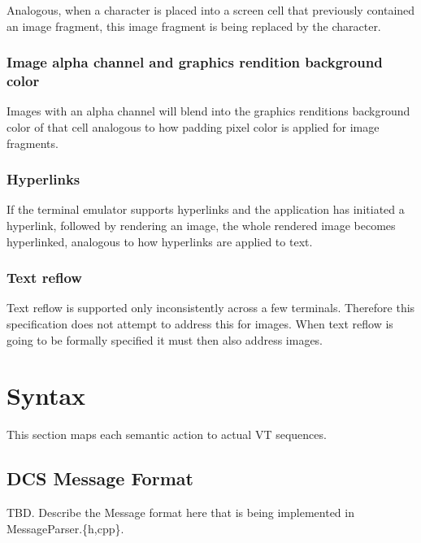 \documentclass[a4paper]{article}
\begin{document}
Analogous, when a character is placed into a screen cell that previously contained an image
fragment, this image fragment is being replaced by the character.

\subsubsection*{Image alpha channel and graphics rendition background color}

Images with an alpha channel will blend into the graphics renditions background color of that cell
analogous to how padding pixel color is applied for image fragments.

\subsubsection*{Hyperlinks}

If the terminal emulator supports hyperlinks and the application has initiated a hyperlink, followed
by rendering an image, the whole rendered image becomes hyperlinked, analogous to how hyperlinks
are applied to text.

\subsubsection*{Text reflow}

Text reflow is supported only inconsistently across a few terminals. Therefore this
specification does not attempt to address this for images. When text reflow is going to
be formally specified it must then also address images.

\section{Syntax} %

This section maps each semantic action to actual VT sequences.

\subsection{DCS Message Format}


TBD. Describe the Message format here that is being implemented in MessageParser.\{h,cpp\}.
\end{document}
